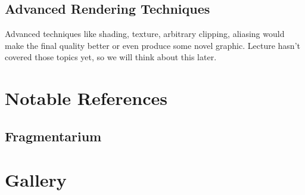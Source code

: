 \documentclass[a4paper]{article}
\begin{document}
\subsection{Advanced Rendering Techniques}
Advanced techniques like shading, texture, arbitrary clipping, aliasing would make the final quality better or even produce some novel graphic.
Lecture hasn't covered those topics yet, so we will think about this later.
\section{Notable References}
\subsection{Fragmentarium}
\section{Gallery}
\begin{figure}[H]
\centering
{}
\end{figure}

\begin{figure}[H]
\centering
{}
\end{figure}
\end{document}
